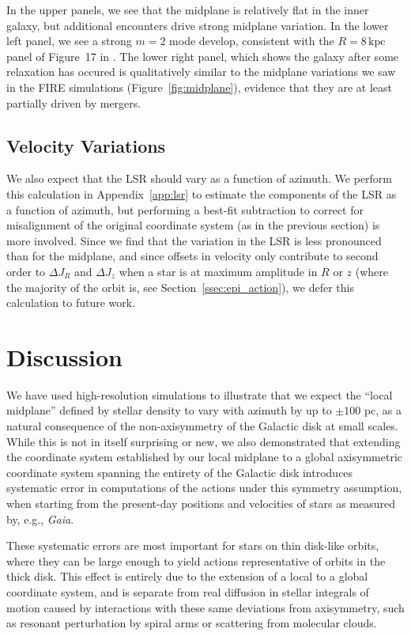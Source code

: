 \documentclass[twocolumn]{aastex62}
\newcommand{\kpc}{\text{kpc}}
\begin{document}
In the upper panels, we see that the midplane is relatively flat in the inner
galaxy, but additional encounters drive strong midplane variation. In the
lower left panel, we see a strong $m=2$ mode develop, consistent with the
$R=8\,\kpc$ panel of Figure~17 in \citet{2018MNRAS.481..286L}. The lower right
panel, which shows the galaxy after some relaxation has occured is
qualitatively similar to the midplane variations we saw in the FIRE
simulations (Figure~\ref{fig:midplane}), evidence that they are at least
partially driven by mergers.

\subsection{Velocity Variations} \label{ssec:lsr_var}
We also expect that the LSR should vary as a function of azimuth. We perform
this calculation in Appendix~\ref{app:lsr} to estimate the components of the
LSR as a function of azimuth, but performing a best-fit subtraction to correct
for misalignment of the original coordinate system (as in the previous
section) is more involved. Since we find that the variation in the LSR is less
pronounced than for the midplane, and since offsets in velocity only
contribute to second order to $\Delta J_R$ and $\Delta J_z$ when a star is at
maximum amplitude in $R$ or $z$ (where the majority of the orbit is, see
Section~\ref{ssec:epi_action}), we defer this calculation to future work.

\section{Discussion} \label{sec:discussion} 
We have used high-resolution simulations to illustrate that we
expect the ``local midplane'' defined by stellar density to vary with azimuth
by up to $\pm 100$ pc, as a natural consequence of the non-axisymmetry of the
Galactic disk at small scales. While this is not in itself surprising or new, we also demonstrated that extending the coordinate system established by our local midplane to a global axisymmetric coordinate system spanning the entirety of the Galactic disk
introduces systematic error in computations of the actions under this symmetry
assumption, when starting from the present-day positions and velocities of
stars as measured by, e.g., \emph{Gaia}.

These systematic errors are most important for stars on thin disk-like orbits,
where they can be large enough to yield actions representative of orbits in
the thick disk. This effect is entirely due to the extension of a local to a
global coordinate system, and is separate from real diffusion in stellar
integrals of motion caused by interactions with these same deviations from
axisymmetry, such as resonant perturbation by spiral arms or scattering from
molecular clouds.
\end{document}

